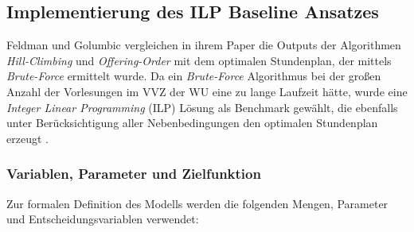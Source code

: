 \subsection{Implementierung des ILP Baseline Ansatzes}

Feldman und Golumbic vergleichen in ihrem Paper \cite{feldmangolumbic} die Outputs der Algorithmen \textit{Hill-Climbing} und \textit{Offering-Order} mit dem optimalen Stundenplan, der mittels \textit{Brute-Force} ermittelt wurde. Da ein \textit{Brute-Force} Algorithmus bei der großen Anzahl der Vorlesungen im VVZ der WU eine zu lange Laufzeit hätte, wurde eine \textit{Integer Linear Programming} (ILP) Lösung als Benchmark gewählt, die ebenfalls unter Berücksichtigung aller Nebenbedingungen den optimalen Stundenplan erzeugt \cite{gh-repo}.


\subsubsection{Variablen, Parameter und Zielfunktion}\label{chap:variablen_parameter_und_zielfunktion}

Zur formalen Definition des Modells werden die folgenden Mengen, Parameter und Entscheidungsvariablen verwendet:

